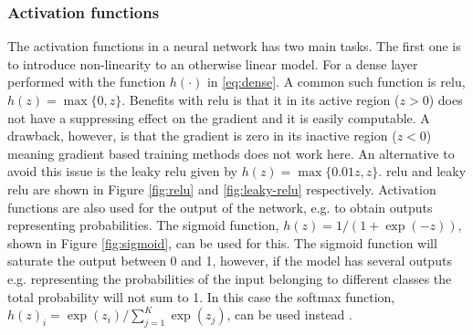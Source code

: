 \subsubsection{Activation functions}
The activation functions in a neural network has two main tasks. The first one is to introduce non-linearity to an otherwise linear model. For a dense layer performed with the function $h(\cdot)$ in \eqref{eq:dense}. A common such function is \gls{relu}, $h(z) = \max\{0,z\}$. Benefits with \gls{relu} is that it in its active region ($z>0$) does not have a suppressing effect on the gradient and it is easily computable. A drawback, however, is that the gradient is zero in its inactive region ($z < 0$) meaning gradient based training methods does not work here. An alternative to avoid this issue is the leaky \gls{relu} given by $h(z) = \max\{0.01 z, z\}$. \gls{relu} and leaky \gls{relu} are shown in Figure \ref{fig:relu} and \ref{fig:leaky-relu} respectively. Activation functions are also used for the output of the network, e.g. to obtain outputs representing probabilities. The sigmoid function, $h(z) = 1/(1+\exp(-z))$, shown in Figure \ref{fig:sigmoid}, can be used for this. The sigmoid function will saturate the output between 0 and 1, however, if the model has several outputs e.g. representing the probabilities of the input belonging to different classes the total probability will not sum to 1. In this case the softmax function, $h(z)_i = \exp(z_i)/\sum_{j=1}^K \exp(z_j)$, can be used instead \cite{Goodfellow2016}. %

